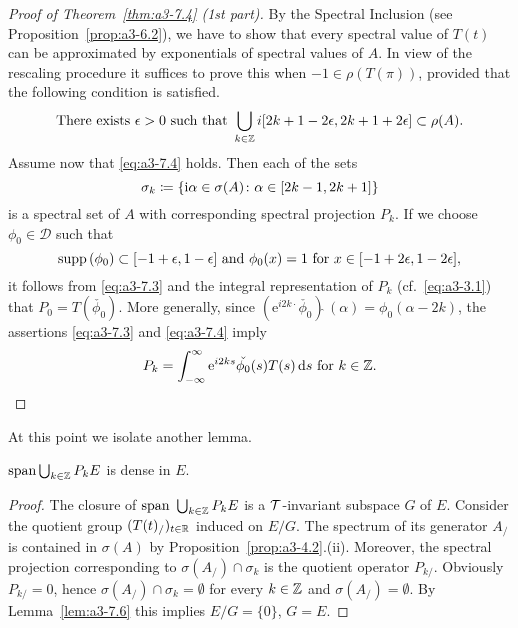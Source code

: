 \begin{proof}[Proof of Theorem~\ref{thm:a3-7.4} (1st part)]
By the Spectral Inclusion (see Proposition~\ref{prop:a3-6.2}), we have to show that every spectral value of $T(t)$ can be approximated by exponentials of spectral values of $A$.
In view of the rescaling procedure it suffices to prove this when $-1 \in \rho(T(\pi))$, provided that the following condition is satisfied.
\begin{equation}\label{eq:a3-7.4}
\text{There exists } \epsilon > 0 \text{ such that } \bigcup_{k\in\mathbb{Z}} i[2k+1-2\epsilon,2k+1+2\epsilon] \subset \rho(A) .
\end{equation}
Assume now that \eqref{eq:a3-7.4} holds.
Then each of the sets 
\[
\sigma_{k}\coloneqq \{\mathrm{i}\alpha \in \sigma(A) \colon \alpha \in [2k-1,2k+1]\}
\] 
is a spectral set of $A$ with corresponding spectral projection $P_{k}$.
If we choose $\phi_{0} \in \mathcal{D}$ such that 
\[
\mathop{}\!\mathrm{supp}\,(\phi_{0}) \subset [-1+\epsilon,1-\epsilon] \text{ and } \phi_{0}(x) = 1 \text{ for } x \in [-1+2\epsilon,1-2\epsilon] ,
\]
it follows from \eqref{eq:a3-7.3} and the integral representation of $P_{k}$ (cf.\ \eqref{eq:a3-3.1}) that $P_{0} = T(\check{\phi_{0}})$.
More generally, since $\left(\mathrm{e}^{i2k\cdot}\check{\phi_{0}}\right){\hat{ }}\,(\alpha) = \phi_{0}(\alpha-2k)$, the assertions \eqref{eq:a3-7.3} and \eqref{eq:a3-7.4} imply
\begin{equation}\label{eq:a3-7.5}
P_{k} = \int_{-\infty}^{\infty} \mathrm{e}^{i2ks}\check{\phi_{0}}(s)T(s)\mathop{}\!\mathrm{d}{s} \text{ for } k \in \mathbb{Z} .
\end{equation}
\end{proof}
At this point we isolate another lemma.
\begin{lemma}\label{lem:a3-7.7}
$\mathrm{span }\bigcup_{k\in\mathbb{Z}} P_{k}E$ is dense in $E$.
\end{lemma}
\begin{proof}
The closure of $\text{span }\bigcup_{k\in\mathbb{Z}} P_{k}E$ is a $\mathcal{T}$-invariant subspace $G$ of $E$.
Consider the quotient group $(T(t)_/)_{t\in\mathbb{R}}$ induced on $E/G$.
The spectrum of its generator $A_{/}$ is contained in $\sigma(A)$ by Proposition~\ref{prop:a3-4.2}.(ii).
Moreover, the spectral projection corresponding to $\sigma(A_{/}) \cap \sigma_{k}$ is the quotient operator $P_{k/}$.
Obviously $P_{k/} = 0$, hence $\sigma(A_{/}) \cap \sigma_{k} = \emptyset$ for every $k \in \mathbb{Z}$ and $\sigma(A_{/}) = \emptyset$.
By Lemma~\ref{lem:a3-7.6} this implies $E/G = \{0\}$, \ie $G = E$.
\end{proof}
